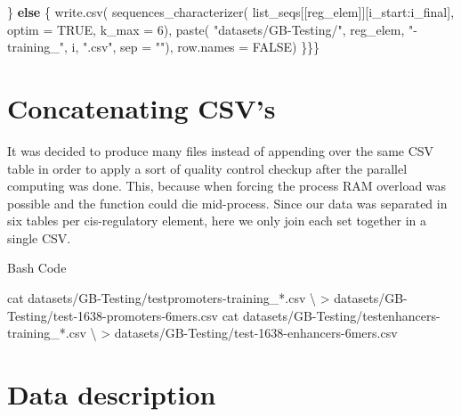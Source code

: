 \documentclass[
  letterpaper,
]{article}
\newenvironment{Shaded}{\begin{snugshade}}{\end{snugshade}}
\newcommand{\AttributeTok}[1]{\textcolor[rgb]{0.40,0.45,0.13}{#1}}
\newcommand{\ConstantTok}[1]{\textcolor[rgb]{0.56,0.35,0.01}{#1}}
\newcommand{\ControlFlowTok}[1]{\textcolor[rgb]{0.00,0.23,0.31}{\textbf{#1}}}
\newcommand{\DataTypeTok}[1]{\textcolor[rgb]{0.68,0.00,0.00}{#1}}
\newcommand{\DecValTok}[1]{\textcolor[rgb]{0.68,0.00,0.00}{#1}}
\newcommand{\FunctionTok}[1]{\textcolor[rgb]{0.28,0.35,0.67}{#1}}
\newcommand{\NormalTok}[1]{\textcolor[rgb]{0.00,0.23,0.31}{#1}}
\newcommand{\OperatorTok}[1]{\textcolor[rgb]{0.37,0.37,0.37}{#1}}
\newcommand{\PreprocessorTok}[1]{\textcolor[rgb]{0.68,0.00,0.00}{#1}}
\newcommand{\SpecialCharTok}[1]{\textcolor[rgb]{0.37,0.37,0.37}{#1}}
\newcommand{\StringTok}[1]{\textcolor[rgb]{0.13,0.47,0.30}{#1}}
\begin{document}
\begin{Shaded}
\begin{Highlighting}[]
\NormalTok{    \} }\ControlFlowTok{else}\NormalTok{ \{}
      \FunctionTok{write.csv}\NormalTok{(}
        \FunctionTok{sequences\_characterizer}\NormalTok{(}
\NormalTok{          list\_seqs[[reg\_elem]][i\_start}\SpecialCharTok{:}\NormalTok{i\_final],}
          \AttributeTok{optim =} \ConstantTok{TRUE}\NormalTok{, }\AttributeTok{k\_max =} \DecValTok{6}\NormalTok{),}
        \FunctionTok{paste}\NormalTok{(}
          \StringTok{"datasets/GB{-}Testing/"}\NormalTok{, reg\_elem,}
          \StringTok{"{-}training\_"}\NormalTok{, i, }\StringTok{".csv"}\NormalTok{, }\AttributeTok{sep =} \StringTok{""}\NormalTok{),}
          \AttributeTok{row.names =} \ConstantTok{FALSE}\NormalTok{)}
\NormalTok{\}\}\}}
\end{Highlighting}
\end{Shaded}

\section{Concatenating CSV's}\label{concatenating-csvs}

It was decided to produce many files instead of appending over the same
CSV table in order to apply a sort of quality control checkup after the
parallel computing was done. This, because when forcing the process RAM
overload was possible and the function could die mid-process. Since our
data was separated in six tables per cis-regulatory element, here we
only join each set together in a single CSV.

\begin{bashheader}
Bash Code
\end{bashheader}
\vspace{-1.75pt}

\begin{Shaded}
\begin{Highlighting}[]
\FunctionTok{cat}\NormalTok{ datasets/GB{-}Testing/testpromoters{-}training\_}\PreprocessorTok{*}\NormalTok{.csv }\DataTypeTok{\textbackslash{}}
    \OperatorTok{\textgreater{}}\NormalTok{ datasets/GB{-}Testing/test{-}1638{-}promoters{-}6mers.csv}
\FunctionTok{cat}\NormalTok{ datasets/GB{-}Testing/testenhancers{-}training\_}\PreprocessorTok{*}\NormalTok{.csv }\DataTypeTok{\textbackslash{}}
    \OperatorTok{\textgreater{}}\NormalTok{ datasets/GB{-}Testing/test{-}1638{-}enhancers{-}6mers.csv}
\end{Highlighting}
\end{Shaded}

\section{Data description}\label{data-description}
\end{document}
